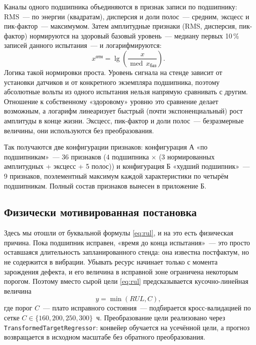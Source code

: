 \documentclass[14pt,a4paper]{extarticle}
\begin{document}
Каналы одного подшипника объединяются в признак записи по подшипнику:
RMS~--- по энергии (квадратам), дисперсия и доли полос~--- средним,
эксцесс и пик-фактор~--- максимумом. Затем амплитудные признаки (RMS,
дисперсия, пик-фактор) нормируются на здоровый базовый уровень~--- медиану
первых 10\,\% записей данного испытания~--- и логарифмируются:
\begin{equation}
x^{\text{отн}} = \lg\!\left(\frac{x}{\operatorname{med}\, x_{\text{баз}}}\right).
\label{eq:logrel}
\end{equation}
Логика такой нормировки проста. Уровень сигнала на стенде зависит от
установки датчиков и от конкретного экземпляра подшипника, поэтому
абсолютные вольты из одного испытания нельзя напрямую сравнивать с другим.
Отношение к собственному «здоровому» уровню это сравнение делает возможным,
а логарифм линеаризует быстрый (почти экспоненциальный) рост амплитуды
в конце жизни. Эксцесс, пик-фактор и доли полос~--- безразмерные величины,
они используются без преобразования.

Так получаются две конфигурации признаков:
конфигурация А «по подшипникам»~--- 36 признаков
($4$ подшипника $\times$ (3 нормированных амплитудных + эксцесс + 5 полос))
и конфигурация Б «худший подшипник»~--- 9 признаков, поэлементный максимум
каждой характеристики по четырём подшипникам. Полный состав признаков
вынесен в приложение Б.

\subsection{Физически мотивированная постановка}

Здесь мы отошли от буквальной формулы \eqref{eq:rul}, и на это есть
физическая причина. Пока подшипник исправен, «время до конца испытания»~---
это просто оставшаяся длительность запланированного стенда: она известна
постфактум, но не содержится в вибрации. Убывать ресурс начинает только
с момента зарождения дефекта, и его величина в исправной зоне ограничена
некоторым порогом. Поэтому вместо сырой цели \eqref{eq:rul} предсказывается
кусочно-линейная величина
\begin{equation}
y = \min(RUL, C),
\label{eq:cap}
\end{equation}
где порог $C$~--- плато исправного состояния~--- подбирается кросс-валидацией
по сетке $C \in \{160, 200, 250, 300\}$~ч. Преобразование цели реализовано
через \texttt{TransformedTargetRegressor}: конвейер обучается на усечённой
цели, а прогноз возвращается в исходном масштабе без обратного
преобразования.
\end{document}
